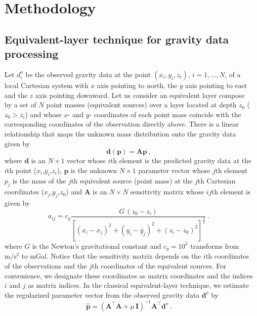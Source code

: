 \documentclass[manuscript,revised]{geophysics}
\begin{document}
\section*{Methodology}

\subsection{Equivalent-layer technique for gravity data processing}

Let $d^{o}_{i}$ be the observed gravity data at
the point $(x_{i}, y_{i}, z_{i})$, $i = 1, ..., N$, of a local Cartesian
system with $x$ axis pointing to north, the $y$ axis pointing to east and 
the $z$ axis pointing downward.
Let us consider an equivalent layer compose by a set of $N$ point masses 
(equivalent sources) over a layer located at depth $z_0$ ($z_0 >z_i$) and whose 
$x$- and $y$- coordinates of each point mass coincide with the corresponding coordinates 
of the observation directly above.
There is a linear relationship that maps the unknown mass distribution onto the gravity 
data given by
\begin{equation}
\mathbf{d}(\mathbf{p}) = \mathbf{A} \mathbf{p} \: ,
\label{eq:predicted-data-vector}
\end{equation}
where $\mathbf{d}$ is an $N \times 1$ vector whose $i$th element is the predicted gravity 
data at the $i$th point ($x_i$,$y_i$,$z_i$), $\mathbf{p}$ is the unknown $N \times 1$ 
parameter vector whose $j$th element $p_j$  is the mass of the $j$th equivalent source 
(point mass) at the $j$th Cartesian coordinates ($x_j$,$y_j$,$z_0$) and $\mathbf{A}$ 
is an $N \times N$  sensitivity matrix whose $ij$th element is given by 
\begin{equation}
a_{ij}= c_{g} \frac{G \, (z_{0} - z_{i})}{\left[(x_{i} - x_{j})^{2} +
(y_{i} - y_{j})^{2} +	(z_{i} - z_{0})^{2} \right]^{\frac{3}{2}}} \; .
\label{eq:aij}
\end{equation}
where $G$ is the Newton's gravitational constant and $c_{g} = 10^{5}$ 
transforms from $\mathrm{m/s^2}$ to mGal.
Notice that the sensitivity matrix depends on the $i$th coordinates of the observations 
and the $j$th coordinates of the equivalent sources. For convenience, we designate 
these coordinates as matrix coordinates and the indices $i$ and $j$ as matrix indices.
In the classical equivalent-layer technique, we estimate the regularized parameter vector 
from the observed gravity data $\mathbf{d}^{o}$ by
\begin{equation}
\hat{\mathbf{p}} = \left( \mathbf{A}^{\top}\mathbf{A} + 
\mu \, \mathbf{I} \right)^{-1}
\mathbf{A}^{\top} \mathbf{d}^{o} \: .
\label{eq:estimated-p-parameter-space}
\end{equation}
\end{document}
